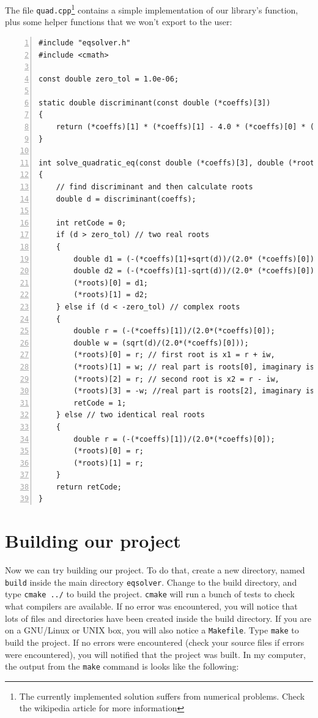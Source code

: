 \documentclass[12pt,a4paper]{article}
\begin{document}
The file \verb+quad.cpp+\footnote{The currently implemented solution suffers from numerical problems. Check the wikipedia article for more information} contains a simple implementation of our library's function, plus some helper
functions that we won't export to the user:
\begin{lstlisting}[basicstyle=\small, numbers=left,caption=quad.cpp,columns=flexible,keywordstyle=\color{black}\ttfamily]
#include "eqsolver.h"
#include <cmath>

const double zero_tol = 1.0e-06;

static double discriminant(const double (*coeffs)[3])
{
	return (*coeffs)[1] * (*coeffs)[1] - 4.0 * (*coeffs)[0] * (*coeffs)[2];
}

int solve_quadratic_eq(const double (*coeffs)[3], double (*roots)[4])
{
	// find discriminant and then calculate roots
	double d = discriminant(coeffs);
	
	int retCode = 0;
	if (d > zero_tol) // two real roots
	{
		double d1 = (-(*coeffs)[1]+sqrt(d))/(2.0* (*coeffs)[0]);
		double d2 = (-(*coeffs)[1]-sqrt(d))/(2.0* (*coeffs)[0]);
		(*roots)[0] = d1;
		(*roots)[1] = d2;
	} else if (d < -zero_tol) // complex roots
	{
		double r = (-(*coeffs)[1])/(2.0*(*coeffs)[0]);
		double w = (sqrt(d)/(2.0*(*coeffs)[0]));
		(*roots)[0] = r; // first root is x1 = r + iw,
		(*roots)[1] = w; // real part is roots[0], imaginary is roots[1]]
		(*roots)[2] = r; // second root is x2 = r - iw,
		(*roots)[3] = -w; //real part is roots[2], imaginary is roots[2]
		retCode = 1;
	} else // two identical real roots
	{
		double r = (-(*coeffs)[1])/(2.0*(*coeffs)[0]);
		(*roots)[0] = r;
		(*roots)[1] = r;
	} 
	return retCode;
}
\end{lstlisting}
\section{Building our project}
Now we can try building our project. To do that, create a new directory, named \verb+build+ inside the main directory \verb+eqsolver+. Change to the build directory, and type \verb+cmake ../+ to build the project. \verb+cmake+ will run a bunch of tests to check what compilers are available. If no error was encountered, you will notice that lots of files and directories have been created inside the build directory. If you are on a GNU/Linux or UNIX box, you will also notice a \verb+Makefile+. Type \verb+make+ to build the project. If no errors were encountered (check your source files if errors were encountered), you will notified that the project was built. In my computer, the output from the \verb+make+ command is looks like the following:
\end{document}
